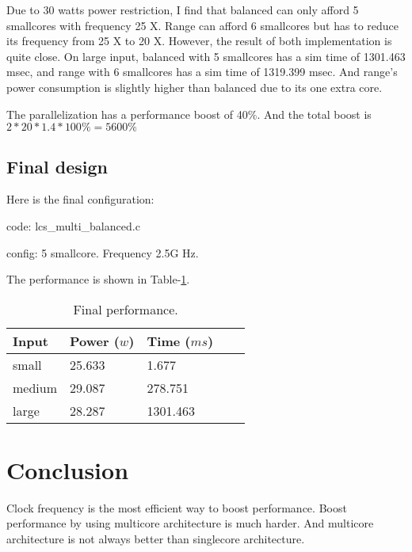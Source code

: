\documentclass[twocolumn,letterpaper,10pt]{article}
\begin{document}
Due to 30 watts power restriction, I find that balanced can only afford 5 smallcores with frequency 25 X. Range can afford 6 smallcores but has to reduce its frequency from 25 X to 20 X. However, the result of both implementation is quite close. On large input, balanced with 5 smallcores has a sim time of 1301.463 msec, and range with 6 smallcores has a sim time of 1319.399 msec. And range's power consumption is slightly higher than balanced due to its one extra core.

The parallelization has a performance boost of 40\%. And the total boost is $2*20*1.4*100\%=5600\%$ 

\subsection{Final design}

Here is the final configuration:

code: lcs\_multi\_balanced.c

config: 5 smallcore. Frequency 2.5G Hz. 

The performance is shown in Table-\ref{tab:foo}.

\begin{table}[ht!]
\begin{center}
\begin{tabular}{lllrr}
\toprule
 Input    &  Power ($w$)  &  Time ($ms$)  \\
\midrule
 small    &  25.633  &      1.677  \\
 medium   &  29.087  &    278.751  \\
 large    &  28.287  &   1301.463  \\

\bottomrule
\end{tabular}
\end{center}
\caption{Final performance.\label{tab:foo}}
\end{table}

\section{Conclusion}

Clock frequency is the most efficient way to boost performance. Boost performance by using multicore architecture is much harder. And multicore architecture is not always better than singlecore architecture. 



\end{document}
